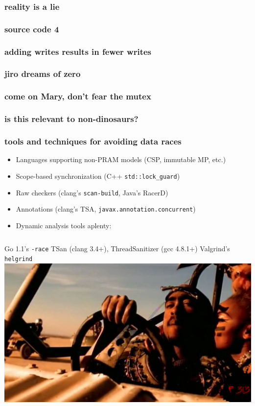 \documentclass{beamer}
\begin{document}
\begin{frame}
\frametitle{reality is a lie}
\end{frame}

\begin{frame}
\frametitle{source code 4}
\end{frame}

\begin{frame}
\frametitle{adding writes results in fewer writes}
\end{frame}

\begin{frame}
\frametitle{jiro dreams of zero}
\end{frame}

\begin{frame}
\frametitle{come on Mary, don't fear the mutex}
\end{frame}

\begin{frame}
\frametitle{is this relevant to non-dinosaurs?}
\end{frame}

\begin{frame}
\frametitle{tools and techniques for avoiding data races}
\begin{itemize}
\item Languages supporting non-PRAM models (CSP, immutable MP, etc.)
\item Scope-based synchronization (C++ \texttt{std::lock\_guard})
\item Raw checkers (clang's {\texttt{scan-build}}, Java's RacerD)
\item Annotations (clang's TSA, {\texttt{javax.annotation.concurrent}})
\item Dynamic analysis tools aplenty:
\end{itemize}
\vfill
\begin{columns}
Go 1.1's \texttt{-race}
\vfill
TSan (clang 3.4+), ThreadSanitizer (gcc 4.8.1+)
\vfill
Valgrind's \texttt{helgrind}
\includegraphics[width=1\textwidth]{maxresdefault.jpg}
\end{columns}
\end{frame}
\end{document}
